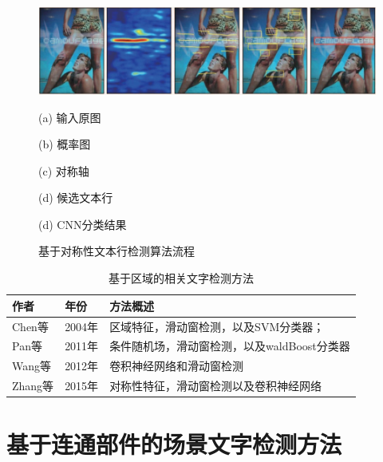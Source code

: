     \begin{figure}[!h]
    \centering
    \includegraphics[width=\textwidth]{./figures/c2_zhang_cnn.jpg}
    \begin{minipage}[t]{0.18\linewidth}
    \centerline{ \small (a) 输入原图}
    \end{minipage}
    \begin{minipage}[t]{0.18\linewidth}
    \centerline{ \small (b) 概率图}
    \end{minipage}
    \begin{minipage}[t]{0.18\linewidth}
    \centerline{ \small (c) 对称轴}
    \end{minipage}
    \begin{minipage}[t]{0.18\linewidth}
    \centerline{ \small (d) 候选文本行}
    \end{minipage}
    \begin{minipage}[t]{0.18\linewidth}
    \centerline{ \small (d) CNN分类结果}
    \end{minipage}
    \caption{基于对称性文本行检测算法流程}
    \label{fig.c2_zhang_cnn}
    \end{figure}

    \begin{table}[!h]
    \centering
    \caption{基于区域的相关文字检测方法}
    \begin{tabular}{p{}|p{}| p{}}
    \hline
    作者 & 年份 & 方法概述 \\
    \hline
    Chen等\cite{Chen2004Detecting} & 2004年 & 区域特征，滑动窗检测，以及SVM分类器；\\
    Pan等\cite{Pan2011A} & 2011年 &   条件随机场，滑动窗检测，以及waldBoost分类器\\
    Wang等\cite{Wang2012End} & 2012年 & 卷积神经网络和滑动窗检测 \\
    Zhang等\cite{Zhang2015Symmetry} & 2015年 & 对称性特征，滑动窗检测以及卷积神经网络 \\
    \hline
    \end{tabular}
    \label{tab.c2_region_based}
    \end{table}

    \section{基于连通部件的场景文字检测方法}

